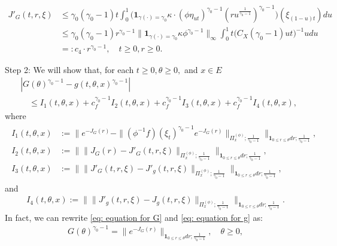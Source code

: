 \documentclass[UTF8]{pkuthss}
\theoremstyle{plain}
\theoremstyle{definition}
\numberwithin{equation}{section}
\begin{document}
\begin{align}\label{eq: upper bound for J'_G}
	J'_G(t,r,\xi)
	&\leq \gamma_0 (\gamma_0 - 1) t \int_0^1 \big( \mathbf 1_{\gamma(\cdot) = \gamma_0} \kappa \cdot (\phi \eta_{ut})^{\gamma_0 - 1} (ru^{\frac{1}{\gamma_0 - 1}})^{\gamma_0 - 1}\big) (\xi_{(1-u)t}) du
	\\&\leq \gamma_0(\gamma_0 - 1) r^{\gamma_0 - 1} \big\|   \mathbf 1_{\gamma(\cdot) = \gamma_0}  \kappa \phi^{\gamma_0 - 1} \big\|_\infty \int_0^1 t \big(  C_X(\gamma_0 - 1) ut \big)^{- 1}  u  du
	\\&=: c_4 \cdot r^{\gamma_0 - 1},
	\quad t\geq 0, r\geq 0.
\end{align}

	Step 2: We will show that, for each $t\geq 0, \theta \geq 0,$ and $x\in E$
\begin{align}
	&|  G(\theta)^{\gamma_0 - 1} - g(t,\theta,x)^{\gamma_0 - 1} |
	\\&\quad \leq I_1(t,\theta,x) +c^{\gamma_0 - 1}_f I_2(t,\theta,x)
	+c^{\gamma_0 - 1}_f I_3(t,\theta,x) + c^{\gamma_0 - 1}_f I_4(t,\theta,x),
\end{align}
	where
\begin{align}
\begin{aligned}
	I_1(t,\theta,x)
	&:= \Big\| e^{ - J_G(r)} - \| (\phi^{-1}f)(\xi_t)^{\gamma_0 - 1} e^{-J_G(r)} \|_{\Pi_x^{(\phi)};\frac{1}{\gamma_0 - 1}} \Big\|_{\mathbf 1_{0\leq r\leq \theta} dr;\frac{1}{\gamma_0 - 1}} ,
	\\I_2(t,\theta,x)
	&:= \Big\|  \|  J_G(r) - J'_G(t,r,\xi)  \|_{\Pi_x^{(\phi)};\frac{1}{\gamma_0 - 1}} \Big\|_{\mathbf 1_{0\leq r\leq \theta} dr;\frac{1}{\gamma_0 - 1}},
	\\I_3(t,\theta,x)
	&:= \Big\| \|  J'_G(t,r,\xi) - J'_g(t,r,\xi)  \|_{\Pi_x^{(\phi)};\frac{1}{\gamma_0 - 1}} \Big\|_{\mathbf 1_{0\leq r\leq \theta} dr;\frac{1}{\gamma_0 - 1}},
\end{aligned}
\end{align}
	and
\begin{align}
	I_4(t,\theta,x)
	:= \Big\| \| J'_g(t,r,\xi) - J_g(t,r,\xi)  \|_{\Pi_x^{(\phi)};\frac{1}{\gamma_0 - 1}} \Big\|_{\mathbf 1_{0\leq r\leq \theta} dr;\frac{1}{\gamma_0 - 1}}.
\end{align}
	In fact, we can rewrite \eqref{eq: equation for G} and \eqref{eq: equation for g} as:
\begin{align}
	G(\theta)^{\gamma_0 - 1} =
	\| e^{ - J_G(r)} \|_{\mathbf 1_{0\leq r\leq \theta} dr;\frac{1}{\gamma_0 - 1}},
	\quad \theta \geq 0,
\end{align}	
\end{document}
